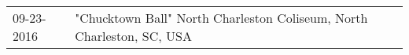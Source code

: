 \begin{supertabular}{ll}
 09-23-2016 &  "Chucktown Ball" North Charleston Coliseum, North Charleston, SC, USA \\
\end{supertabular}
